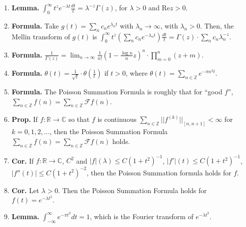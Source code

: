 \begin{enumerate}
	\item \textbf{Lemma. } $\int_{0}^{\infty} t^z e^{-\lambda t} \frac{dt}{t} = \lambda^{-z} \Gamma(z)$, for $\lambda>0$ and $\textrm{Re}z>0$. 
	\item \textbf{Formula. } Take $g(t) = \sum_n c_n e^{\lambda_n t}$ with $\lambda_n \to \infty$, with $\lambda_n > 0$. Then, the Mellin transform of $g(t)$ is $\int_{0}^{\infty} t^z (\sum_n c_n e^{-\lambda_n t}) \frac{dt}{t} = \Gamma(z) \cdot \sum_n c_n \lambda_n^{-z}$. 
	\item \textbf{Formula. } $\frac{1}{\Gamma(z)} = \lim_{n \to \infty} \frac{1}{n!} \left(1 - \frac{\log n}{n}z\right)^n \cdot \prod_{m=0}^n (z+m)$. 
	\item \textbf{Formula. } $\theta(t) = \frac{1}{\sqrt{t}} \cdot \theta(\frac{1}{t})$ if $t>0$, where $\theta(t) = \sum_{n \in \mathbb{Z}} e^{-\pi n^2 t}$. 
	\item \textbf{Formula. } The Poisson Summation Formula is roughly that for \enquote{good $f$}, $\sum_{n \in \mathbb{Z}} f(n) = \sum_{n \in \mathbb{Z}} \mathscr{F}f(n)$. 
	\item \textbf{Prop. } If $f: \mathbb{R} \to \mathbb{C}$ so that $f$ is continuous $\sum_{n \in \mathbb{Z}} ||f^{(k)}||_{[n,n+1]} < \infty$ for $k=0,1,2,\dots$, then the Poisson Summation Formula $\sum_{n \in \mathbb{Z}} f(n) = \sum_{n \in \mathbb{Z}} \mathscr{F}f(n)$ holds. 
	\item \textbf{Cor. } If $f: \mathbb{R} \to \mathbb{C}$, $C^2$ and $|f|(\lambda) \leq C(1+t^2)^{-1}$, $|f'|(t) \leq C(1+t^2)^{-1}$, $|f''(t)| \leq C(1+t^2)^{-2}$, then the Poisson Summation formula holds for $f$. 
	\item \textbf{Cor. } Let $\lambda>0$. Then the Poisson Summation Formula holds for $f(t) = e^{-\lambda t^2}$. 
	\item \textbf{Lemma. } $\int_{-\infty}^{\infty} e^{-\pi t^2} dt = 1$, which is the Fourier transform of $e^{-\lambda t^2}$. 
\end{enumerate}  
 

